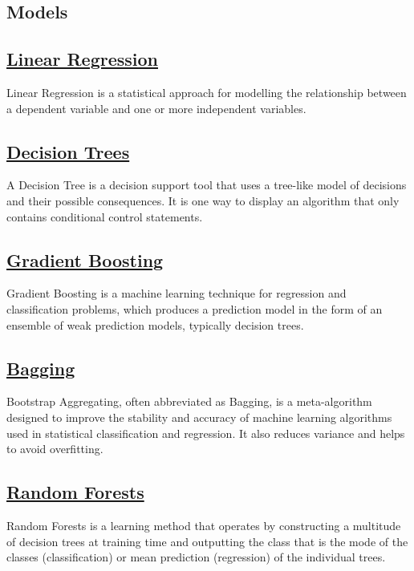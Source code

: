 \documentclass[conference]{IEEEtran}
\begin{document}
    \subsection*{Models}
    \subsection{\href{https://en.wikipedia.org/wiki/Linear_regression}{Linear Regression}}
    Linear Regression is a statistical approach for modelling the relationship between a dependent variable and one or more independent variables.
    \subsection{\href{https://en.wikipedia.org/wiki/Decision_tree}{Decision Trees}}
    A Decision Tree is a decision support tool that uses a tree-like model of decisions and their possible consequences. It is one way to display an algorithm that only contains conditional control statements.
    \subsection{\href{https://en.wikipedia.org/wiki/Gradient_boosting}{Gradient Boosting}}
    Gradient Boosting is a machine learning technique for regression and classification problems, which produces a prediction model in the form of an ensemble of weak prediction models, typically decision trees.
    \subsection{\href{https://en.wikipedia.org/wiki/Bootstrap_aggregating}{Bagging}}
    Bootstrap Aggregating, often abbreviated as Bagging, is a meta-algorithm designed to improve the stability and accuracy of machine learning algorithms used in statistical classification and regression. It also reduces variance and helps to avoid overfitting.
    \subsection{\href{https://en.wikipedia.org/wiki/Random_forest}{Random Forests}}
    Random Forests is a learning method that operates by constructing a multitude of decision trees at training time and outputting the class that is the mode of the classes (classification) or mean prediction (regression) of the individual trees.
\end{document}

